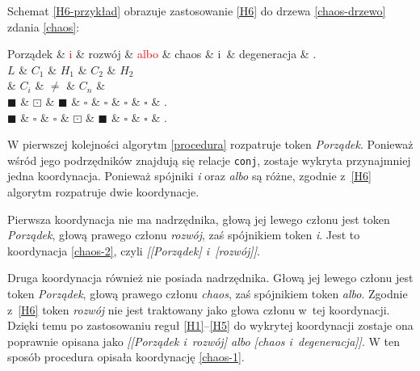 Schemat \eqref{H6-przykład} obrazuje zastosowanie \ref{H6} do drzewa \eqref{chaos-drzewo} zdania \eqref{chaos}:

\begin{exe}
\ex \label{H6-przykład}
\begin{dependency}[baseline=5.6ex]
\begin{deptext}[column sep=1em, row sep=.3ex]
Porządek \& \textcolor{red}{i} \& rozwój \& \textcolor{red}{albo} \& chaos \& i~\& degeneracja \& .  \\ 
$L$ \& $C_{1}$ \& $H_{1}$ \& $C_{2}$ \& $H_{2}$ \\
 \& $C_{i}$ \& $\neq$ \& $C_{n}$ \& \\
$\blacksquare$ \& $\boxdot$ \& $\blacksquare$ \& $\square$ \& $\square$ \& $\square$ \& $\square$ \& . \\
$\blacksquare$ \& $\square$ \& $\square$ \& $\boxdot$ \& $\blacksquare$ \& $\square$ \& $\square$ \& . \\
\end{deptext}
\end{dependency}
\end{exe}

W pierwszej kolejności algorytm \eqref{procedura} rozpatruje token \textit{Porządek}. Ponieważ wśród jego podrzędników znajdują się relacje \texttt{conj}, zostaje wykryta przynajmniej jedna koordynacja. Ponieważ spójniki \emph{i} oraz \emph{albo} są różne, zgodnie z~\ref{H6} algorytm rozpatruje dwie koordynacje.

Pierwsza koordynacja nie ma nadrzędnika, głową jej lewego członu jest token \textit{Porządek}, głową prawego członu \textit{rozwój}, zaś spójnikiem token \textit{i}. Jest to koordynacja \eqref{chaos-2}, czyli \textit{[[Porządek] i~[rozwój]]}.

Druga koordynacja również nie posiada nadrzędnika. Głową jej lewego członu jest token \textit{Porządek}, głową prawego członu \textit{chaos}, zaś spójnikiem token \textit{albo}. Zgodnie z~\ref{H6} token \textit{rozwój} nie jest traktowany jako głowa członu w~tej koordynacji. Dzięki temu po zastosowaniu reguł \ref{H1}--\ref{H5} do wykrytej koordynacji zostaje ona poprawnie opisana jako \textit{[[Porządek i~rozwój] albo [chaos i~degeneracja]]}. W ten sposób procedura opisała koordynację \eqref{chaos-1}. 

